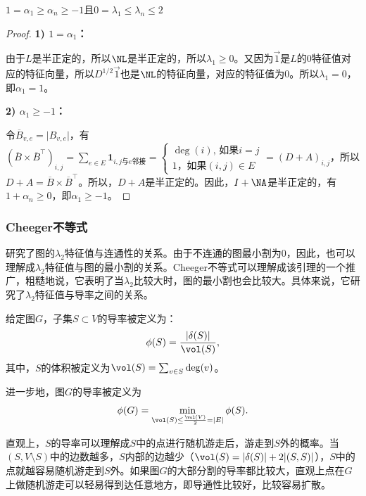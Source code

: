 \documentclass[lang=cn,newtx,10pt,scheme=chinese,chinesefont=nofont,citestyle=gb7714-2015, bibstyle=gb7714-2015]{elegantbook}
\providecommand{\abs}[1]{\lvert#1\rvert}
\begin{document}
\begin{refsection}
\begin{lemma}
    $1=\alpha_1\geq\alpha_n\geq-1$且$0=\lambda_1\leq\lambda_n\leq2$
\end{lemma}
\begin{proof}
\textbf{1) $1=\alpha_1$：}
    
由于$L$是半正定的，所以$\NL$是半正定的，所以$\lambda_1\geq0$。又因为$\overrightarrow{1}$是$L$的$0$特征值对应的特征向量，所以$D^{1/2}\overrightarrow{1}$也是$\NL$的特征向量，对应的特征值为$0$。所以$\lambda_1=0$，即$\alpha_1=1$。

\textbf{2) $\alpha_1\geq-1$：}

令$\overline{B}_{v,e}=\abs{B_{v,e}}$，有$(\overline{B}\times\overline{B}^{\top})_{i,j}=\sum_{e\in E}\mathbf{1}_{i,j\text{与$e$邻接}}=\begin{cases}
    \deg(i)\text{, 如果$i=j$}\\
    1\text{，如果$(i,j)\in E$}
\end{cases}=(D+A)_{i,j}$，所以$D+A=\overline{B}\times\overline{B}^{\top}$。所以，$D+A$是半正定的。因此，$I+\NA$是半正定的，有$1+\alpha_n\geq0$，即$\alpha_1\geq-1$。
\end{proof}

\subsubsection{Cheeger不等式}

研究了图的$\lambda_2$特征值与连通性的关系。由于不连通的图最小割为$0$，因此，也可以理解成$\lambda_2$特征值与图的最小割的关系。Cheeger不等式可以理解成该引理的一个推广，粗糙地说，它表明了当$\lambda_2$比较大时，图的最小割也会比较大。具体来说，它研究了$\lambda_2$特征值与导率之间的关系。

\begin{definition}[导率（conductance）]
    给定图$G$，子集$S\subset V$的导率被定义为：
    \[\phi(S)=\frac{\abs{\delta(S)}}{\vol(S)},\]
    其中，$S$的体积被定义为$\vol(S)=\sum_{v\in S}\deg(v)$。

    进一步地，图$G$的导率被定义为\[\phi(G)=\min_{\vol(S)\leq\frac{\vol(V)}{2}=\abs{E}}\phi(S).\]
\end{definition}

直观上，$S$的导率可以理解成$S$中的点进行随机游走后，游走到$S$外的概率。当$(S,V\setminus S)$中的边数越多，$S$内部的边越少（$\vol(S)=\abs{\delta(S)}+2\abs{(S,S)}$），$S$中的点就越容易随机游走到$S$外。如果图$G$的大部分割的导率都比较大，直观上点在$G$上做随机游走可以轻易得到达任意地方，即导通性比较好，比较容易扩散。


\end{refsection}
\end{document}
